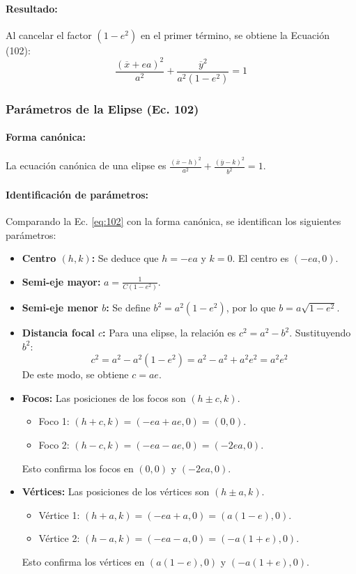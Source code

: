 \documentclass[12pt, a4paper]{article}
\newcommand{\xbar}{\overline{x}}
\newcommand{\ybar}{\overline{y}}
\begin{document}
\paragraph{Resultado:} Al cancelar el factor $(1-e^{2})$ en el primer término, se obtiene la Ecuación (102):
\begin{equation}
    \frac{(\xbar+ea)^{2}}{a^{2}}+\frac{\ybar^{2}}{a^{2}(1-e^{2})}=1
    \label{eq:102}
\end{equation}

\subsubsection*{Parámetros de la Elipse (Ec. 102)}

\paragraph{Forma canónica:} La ecuación canónica de una elipse es $\frac{(\xbar - h)^{2}}{a^{2}} + \frac{(\ybar - k)^{2}}{b^{2}} = 1$.

\paragraph{Identificación de parámetros:} Comparando la Ec. \eqref{eq:102} con la forma canónica, se identifican los siguientes parámetros:
\begin{itemize}
    \item \textbf{Centro $(h, k)$:} Se deduce que $h = -ea$ y $k = 0$. El centro es $(-ea, 0)$.
    \item \textbf{Semi-eje mayor:} $a = \frac{1}{C(1-e^{2})}$.
    \item \textbf{Semi-eje menor $b$:} Se define $b^{2} = a^{2}(1-e^{2})$, por lo que $b = a\sqrt{1-e^{2}}$.
    \item \textbf{Distancia focal $c$:} Para una elipse, la relación es $c^{2} = a^{2} - b^{2}$. Sustituyendo $b^2$:
    \[
        c^{2} = a^{2} - a^{2}(1-e^{2}) = a^{2} - a^{2} + a^{2}e^{2} = a^{2}e^{2}
    \]
    De este modo, se obtiene $c = ae$.
    \item \textbf{Focos:} Las posiciones de los focos son $(h \pm c, k)$.
    \begin{itemize}
        \item Foco 1: $(h+c, k) = (-ea + ae, 0) = (0, 0)$.
        \item Foco 2: $(h-c, k) = (-ea - ae, 0) = (-2ea, 0)$.
    \end{itemize}
    Esto confirma los focos en $(0, 0)$ y $(-2ea, 0)$.
    \item \textbf{Vértices:} Las posiciones de los vértices son $(h \pm a, k)$.
    \begin{itemize}
        \item Vértice 1: $(h+a, k) = (-ea + a, 0) = (a(1-e), 0)$.
        \item Vértice 2: $(h-a, k) = (-ea - a, 0) = (-a(1+e), 0)$.
    \end{itemize}
    Esto confirma los vértices en $(a(1-e), 0)$ y $(-a(1+e), 0)$.
\end{itemize}
\end{document}
